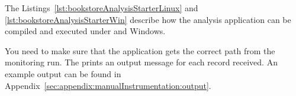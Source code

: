 The Listings~\ref{lst:bookstoreAnalysisStarterLinux} and \ref{lst:bookstoreAnalysisStarterWin} %
describe how the analysis application can be compiled and executed under \UnixLikeSystems{} and Windows.

\setBashListing
\enlargethispage{1.0cm}




\noindent You need to make sure that the application gets the correct path from the monitoring run.
The  prints an output message for each record received. %
An example output can be found in Appendix~\ref{sec:appendix:manualInstrumentation:output}.

